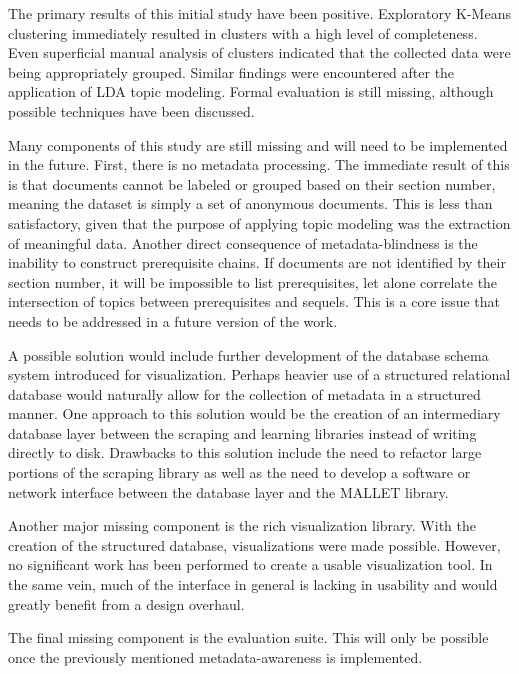The primary results of this initial study have been positive. Exploratory
K-Means clustering immediately resulted in clusters with a high level of
completeness. Even superficial manual analysis of clusters indicated that
the collected data were being appropriately grouped. Similar findings were
encountered after the application of LDA topic modeling. Formal evaluation
is still missing, although possible techniques have been discussed.

Many components of this study are still missing and will need to be
implemented in the future. First, there is no metadata processing. The
immediate result of this is that documents cannot be labeled or grouped
based on their section number, meaning the dataset is simply a set of
anonymous documents. This is less than satisfactory, given that the purpose
of applying topic modeling was the extraction of meaningful data. Another
direct consequence of metadata-blindness is the inability to construct
prerequisite chains. If documents are not identified by their section
number, it will be impossible to list prerequisites, let alone correlate
the intersection of topics between prerequisites and sequels. This is a
core issue that needs to be addressed in a future version of the work.

A possible solution would include further development of the database
schema system introduced for visualization. Perhaps heavier use of a
structured relational database would naturally allow for the collection of
metadata in a structured manner. One approach to this solution would be the
creation of an intermediary database layer between the scraping and
learning libraries instead of writing directly to disk. Drawbacks to this
solution include the need to refactor large portions of the scraping
library as well as the need to develop a software or network interface
between the database layer and the MALLET library.

Another major missing component is the rich visualization library. With the
creation of the structured database, visualizations were made possible.
However, no significant work has been performed to create a usable
visualization tool. In the same vein, much of the interface in general is
lacking in usability and would greatly benefit from a design overhaul.

The final missing component is the evaluation suite. This will only be
possible once the previously mentioned metadata-awareness is implemented.
